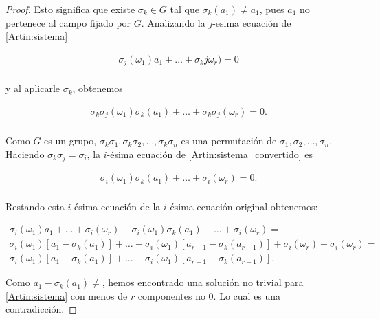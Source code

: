 \begin{proof}
    Esto significa que existe $\sigma_k \in G$ tal que $\sigma_k(a_1) \not= a_1$, pues $a_1$ no pertenece al campo fijado por $G$.
    Analizando la $j$-esima ecuación de \eqref{Artin:sistema}
    
    \begin{align}
        \sigma_j(\omega_1)a_1   +   \dots   +   \sigma_kj\omega_{r})   =   0       \\
    \end{align}
    
    y al aplicarle $\sigma_k$, obtenemos
        
    \begin{align} \label{Artin:sistema_convertido}
        \sigma_k\sigma_j(\omega_1)\sigma_k(a_1)   +   \dots   +   \sigma_k\sigma_j(\omega_{r})   =   0.       \\
    \end{align}\par\null
    
    Como $G$ es un grupo, $\sigma_k\sigma_1, \sigma_k\sigma_2, \dots, \sigma_k\sigma_n$ es una permutación de
    $\sigma_1, \sigma_2, \dots, \sigma_n$. Haciendo $\sigma_k \sigma_j = \sigma_i$, la $i$-ésima ecuación de \eqref{Artin:sistema_convertido}
    es
    
    \begin{align}
        \sigma_i(\omega_1)\sigma_k(a_1)   +   \dots   +   \sigma_i(\omega_{r})   =   0.       \\
    \end{align}
    
    Restando esta $i$-ésima ecuación de la $i$-ésima ecuación original obtenemos:
    
    \begin{align}
        \sigma_i(\omega_1) a_1   +   \dots   +   \sigma_i(\omega_{r}) - \sigma_i(\omega_1)\sigma_k(a_1)   +   \dots   +   \sigma_i(\omega_{r})                      =\\
        \sigma_i(\omega_1) [a_1 - \sigma_k(a_1)]   +   \dots   +  \sigma_i(\omega_1) [a_{r-1} - \sigma_k(a_{r-1})] + \sigma_i(\omega_{r}) - \sigma_i(\omega_{r})    =\\
        \sigma_i(\omega_1) [a_1 - \sigma_k(a_1)]   +   \dots   +  \sigma_i(\omega_1) [a_{r-1} - \sigma_k(a_{r-1})].  
    \end{align}
    
    Como $a_1 - \sigma_k(a_1) \not=$, hemos encontrado una solución no trivial para \eqref{Artin:sistema} con menos de $r$ componentes no $0$. Lo cual
    es una contradicción.
\end{proof}